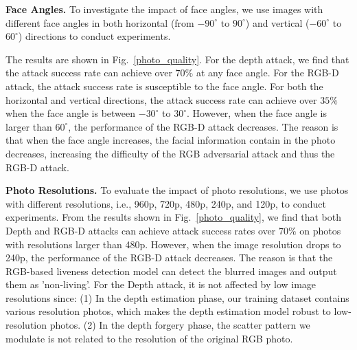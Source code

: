 \textbf{Face Angles.}
To investigate the impact of face angles, we use images with different face angles in both horizontal (from $-90^\circ$ to $90^\circ$) and vertical  ($-60^\circ$ to $60^\circ$) directions to conduct experiments. 

The results are shown in Fig.~\ref{photo_quality}. For the depth attack, we find that the attack success rate can achieve over $70\%$ at any face angle. 
For the RGB-D attack, the attack success rate is susceptible to the face angle.
For both the horizontal and vertical directions, the attack success rate can achieve over $35\%$ when the face angle is between $-30^\circ$  to $30^\circ$. However, when the face angle is larger than $60^\circ$, the performance of the RGB-D attack decreases.
The reason is that when the face angle increases, the facial information contain in the photo decreases, increasing the difficulty of the RGB adversarial attack and thus the RGB-D attack.





\textbf{Photo Resolutions.}
To evaluate the impact of photo resolutions, we use photos with different resolutions, i.e., 960p, 720p, 480p, 240p, and 120p, to conduct experiments. From the results shown in Fig.~\ref{photo_quality}, we find that both Depth and  RGB-D attacks can achieve attack success rates over $70\%$ on photos with resolutions larger than 480p. 
However, when the image resolution drops to 240p, the performance of the RGB-D attack decreases.
The reason is that the RGB-based liveness detection model can detect the blurred images and output them as 'non-living'. 
For the Depth attack, it is not affected by low image resolutions since: (1) In the depth estimation phase, our training dataset contains various resolution photos, which makes the depth estimation model robust to low-resolution photos. (2) In the depth forgery phase, the scatter pattern we modulate is not related to the resolution of the original RGB photo.

